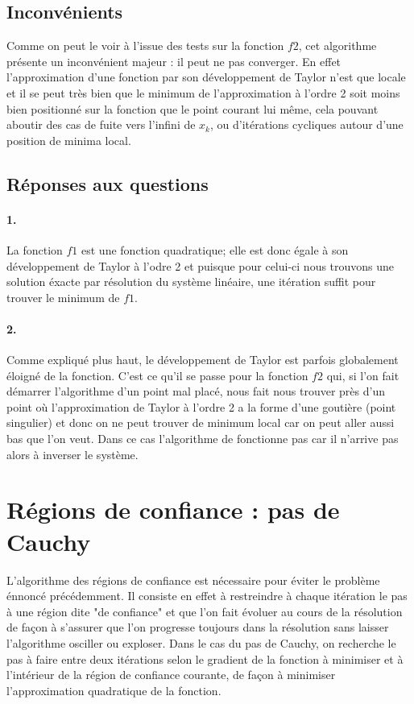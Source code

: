 \documentclass[12pt]{article}	%
\begin{document}
\subsection{Inconvénients}
Comme on peut le voir à l'issue des tests sur la fonction $f2$, cet algorithme présente un inconvénient majeur : il peut ne pas converger. En effet l'approximation d'une fonction par son développement de Taylor n'est que locale et il se peut très bien que le minimum de l'approximation à l'ordre 2 soit moins bien positionné sur la fonction que le point courant lui même, cela pouvant aboutir des cas de fuite vers l'infini de $x_k$, ou d'itérations cycliques autour d'une position de minima local.

\subsection{Réponses aux questions}
\paragraph{1.}
La fonction $f1$ est une fonction quadratique; elle est donc égale à son développement de Taylor à l'odre 2 et puisque pour celui-ci nous trouvons une solution éxacte par résolution du système linéaire, une itération suffit pour trouver le minimum de $f1$.

\paragraph{2.}
Comme expliqué plus haut, le développement de Taylor est parfois globalement éloigné de la fonction. C'est ce qu'il se passe pour la fonction $f2$ qui, si l'on fait démarrer l'algorithme d'un point mal placé, nous fait nous trouver près d'un point où l'approximation de Taylor à l'ordre 2 a la forme d'une goutière (point singulier) et donc on ne peut trouver de minimum local car on peut aller aussi bas que l'on veut. Dans ce cas l'algorithme de fonctionne pas car il n'arrive pas alors à inverser le système.

\section{Régions de confiance : pas de Cauchy}
L'algorithme des régions de confiance est nécessaire pour éviter le problème énnoncé précédemment. Il consiste en effet à restreindre à chaque itération le pas à une région dite "de confiance" et que l'on fait évoluer au cours de la résolution de façon à s'assurer que l'on progresse toujours dans la résolution sans laisser l'algorithme osciller ou exploser. Dans le cas du pas de Cauchy, on recherche le pas à faire entre deux itérations selon le gradient de la fonction à minimiser et à l'intérieur de la région de confiance courante, de façon à minimiser l'approximation quadratique de la fonction.
\end{document}
